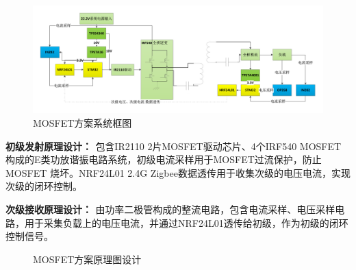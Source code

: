 ﻿\documentclass[UTF-8,12pt]{ctexart}
\begin{document}
        \begin{figure}[H]
          \centering
          \includegraphics[width=18cm]{sys.pdf}
          \caption{MOSFET方案系统框图}
          \label{sch_MOSFET}
        \end{figure}
        {\bf{
        初级发射原理设计：
        }}
            包含IR2110 2片MOSFET驱动芯片、4个IRF540 MOSFET构成的E类功放谐振电路系统，初级电流采样用于MOSFET过流保护，防止MOSFET 烧坏。NRF24L01 2.4G Zigbee数据透传用于收集次级的电压电流，实现次级的闭环控制。

        {\bf{
        次级接收原理设计：
        }}
            由功率二极管构成的整流电路，包含电流采样、电压采样电路，用于采集负载上的电压电流，并通过NRF24L01透传给初级，作为初级的闭环控制信号。

        \begin{figure}[htbp]
        \centering %
        \caption{MOSFET方案原理图设计} %
        \label{MOSFET方案原理图设计}         %
        \end{figure}
\end{document}
